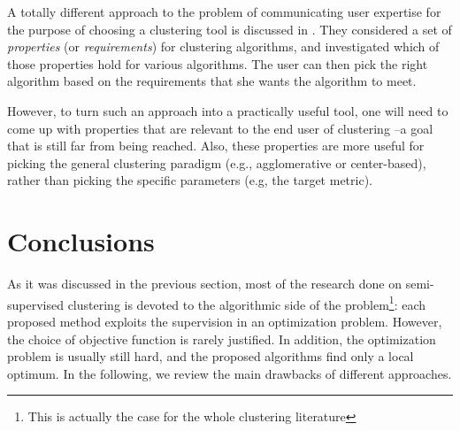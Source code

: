\documentclass[letterpaper,12pt,titlepage,oneside,final]{book}
\begin{document}
A totally different approach to the problem of communicating user expertise for the purpose of choosing a clustering tool is discussed in \cite{ackerman2010towards}. They considered a set of \textit{properties} (or \textit{requirements}) for clustering algorithms, and investigated which of those properties hold for various algorithms. The user can then pick the right algorithm based on the requirements that she wants the algorithm to meet.

However, to turn such an approach into a practically useful tool, one will need to come up with properties that are relevant to the end user of clustering --a goal that is still far from being reached. Also, these properties are more useful for picking the general clustering paradigm (e.g., agglomerative or center-based), rather than picking the specific parameters (e.g, the target metric).


%
%
%
%
%
%
%


\section{Conclusions}

As it was discussed in the previous section, most of the research done on semi-supervised clustering is devoted to the algorithmic side of the problem\footnote{This is actually the case for the whole clustering literature}: each proposed method exploits the supervision in an optimization problem. However, the choice of objective function is rarely justified. In addition, the optimization problem is usually still hard, and the proposed algorithms find only a local optimum. In the following, we review the main drawbacks of different approaches.
\end{document}
